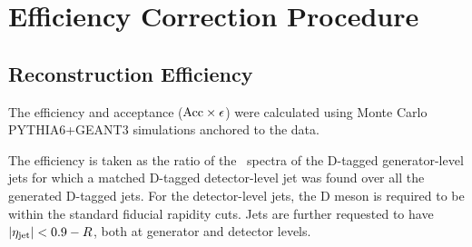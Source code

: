 
\section{Efficiency Correction Procedure}

\subsection{Reconstruction Efficiency}
\label{sect:sub_DmesonRecEff}
The efficiency and acceptance (${\rm Acc} \times \epsilon$) were calculated using Monte Carlo PYTHIA6+GEANT3 simulations anchored to the data.

The efficiency is taken as the ratio of the \ptd\ spectra of the D-tagged generator-level jets for which a matched
D-tagged detector-level jet was found over all the generated D-tagged jets.
For the detector-level jets, the D meson is required to be within the standard fiducial rapidity cuts.
Jets are further requested to have $|\eta_{\rm jet}| < 0.9 - R$, both at generator and detector levels.

